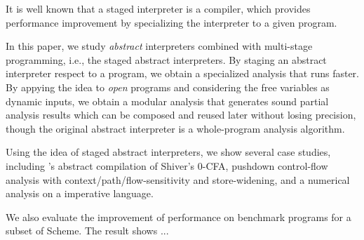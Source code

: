 It is well known that a staged interpreter is a compiler, which provides performance improvement
by specializing the interpreter to a given program.

In this paper, we study \textit{abstract} interpreters combined with multi-stage programming, i.e., the 
staged abstract interpreters. 
By staging an abstract interpreter respect to a program, we obtain a specialized analysis that runs faster.
By appying the idea to \textit{open} programs and considering the free variables as dynamic inputs, 
we obtain a modular analysis that generates sound partial analysis results which can be composed 
and reused later without losing precision, though the original abstract interpreter is a whole-program 
analysis algorithm.

Using the idea of staged abstract interpreters, we show several case studies, including 
\citeauthor{Boucher:1996:ACN:647473.727587}'s abstract compilation of Shiver's 0-CFA, pushdown
control-flow analysis with context/path/flow-sensitivity and store-widening, and a numerical
analysis on a imperative language.

We also evaluate the improvement of performance on benchmark programs for a subset of Scheme.
The result shows ...

